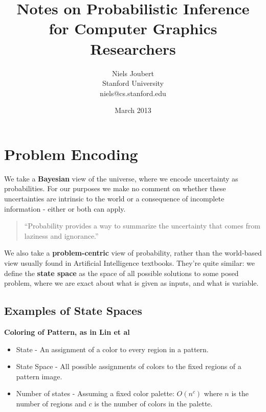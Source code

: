\documentclass[]{article}
\title{Notes on Probabilistic Inference \\for Computer Graphics Researchers}
\author{ Niels Joubert \\
    Stanford University \\
    niels@cs.stanford.edu
}
\date{March 2013}
\begin{document}
\ifpdf
{}
\else
{}
\fi

\setlength{\parindent}{0cm}

\maketitle

\tableofcontents

\pagebreak

\section{Problem Encoding}

We take a \textbf{Bayesian} view of the universe, where we encode uncertainty as probabilities. For our purposes we make no comment on whether these uncertainties are intrinsic to the world or a consequence of incomplete information - either or both can apply. 

\begin{quote}``Probability provides a way to summarize the uncertainty that comes from laziness and ignorance.'' \cite{russel-norvig}\end{quote}

We also take a \textbf{problem-centric} view of probability, rather than the world-based view usually found in Artificial Intelligence textbooks. They're quite similar: we define the \textbf{state space} as the space of all possible solutions to some posed problem, where we are exact about what is given as inputs, and what is variable.

\subsection{Examples of State Spaces}

\textbf{Coloring of Pattern, as in Lin et al \cite{LinColorPatterns}}

\begin{itemize}
	\item State - An assignment of a color to every region in a pattern.
	\item State Space - All possible assignments of colors to the fixed regions of a pattern image.
	\item Number of states - Assuming a fixed color palette: $O(n^c)$ where $n$ is the number of regions and $c$ is the number of colors in the palette.
\end{itemize}
\end{document}
